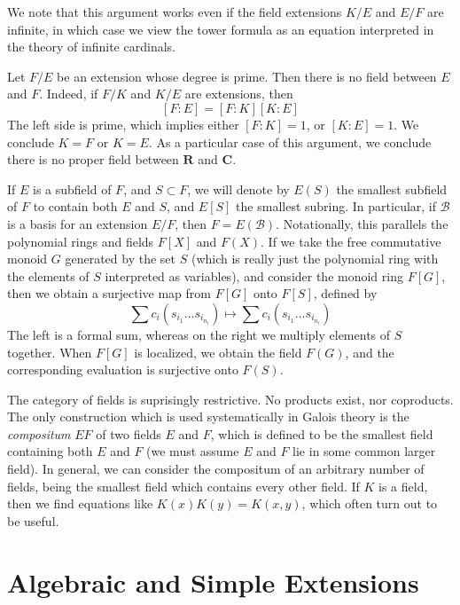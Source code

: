 We note that this argument works even if the field extensions $K/E$ and $E/F$ are infinite, in which case we view the tower formula as an equation interpreted in the theory of infinite cardinals.

\begin{example}
    Let $F/E$ be an extension whose degree is prime. Then there is no field between $E$ and $F$. Indeed, if $F/K$ and $K/E$ are extensions, then
    \[ [F:E] = [F:K][K:E] \]
    The left side is prime, which implies either $[F:K] = 1$, or $[K:E] = 1$. We conclude $K = F$ or $K = E$. As a particular case of this argument, we conclude there is no proper field between $\mathbf{R}$ and $\mathbf{C}$.
\end{example}

If $E$ is a subfield of $F$, and $S \subset F$, we will denote by $E(S)$ the smallest subfield of $F$ to contain both $E$ and $S$, and $E[S]$ the smallest subring. In particular, if $\mathcal{B}$ is a basis for an extension $E/F$, then $F = E(\mathcal{B})$. Notationally, this parallels the polynomial rings and fields $F[X]$ and $F(X)$. If we take the free commutative monoid $G$ generated by the set $S$ (which is really just the polynomial ring with the elements of $S$ interpreted as variables), and consider the monoid ring $F[G]$, then we obtain a surjective map from $F[G]$ onto $F[S]$, defined by
%
\[ \sum c_i (s_{i_1} \dots s_{i_{n_i}}) \mapsto \sum c_i (s_{i_1} \dots s_{i_{n_i}}) \]
%
The left is a formal sum, whereas on the right we multiply elements of $S$ together. When $F[G]$ is localized, we obtain the field $F(G)$, and the corresponding evaluation is surjective onto $F(S)$.

The category of fields is suprisingly restrictive. No products exist, nor coproducts. The only construction which is used systematically in Galois theory is the {\it compositum} $EF$ of two fields $E$ and $F$, which is defined to be the smallest field containing both $E$ and $F$ (we must assume $E$ and $F$ lie in some common larger field). In general, we can consider the compositum of an arbitrary number of fields, being the smallest field which contains every other field. If $K$ is a field, then we find equations like $K(x)K(y) = K(x,y)$, which often turn out to be useful.

\section{Algebraic and Simple Extensions}

